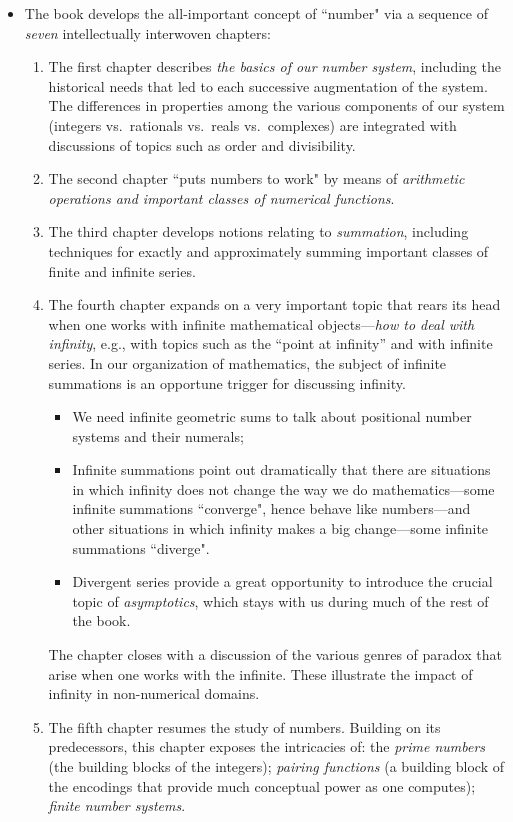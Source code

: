 \documentclass{article}[12pt]
\begin{document}
\begin{itemize}
  \item
The book develops the all-important concept of ``number" via a sequence of {\em seven} intellectually interwoven chapters:
   \begin{enumerate}
   \item       
The first chapter describes {\em the basics of our number system}, including the historical needs that led to each successive augmentation of the system.  The differences in properties among the various components of our system (integers vs.~rationals vs.~reals vs.~complexes) are integrated with discussions of topics such as order and divisibility.
  \item
The second chapter ``puts numbers to work" by means of {\em arithmetic operations and important classes of numerical functions}.
  \item
The third chapter develops notions relating to {\em summation}, including techniques for exactly and approximately summing important classes of finite and infinite series.
  \item
The fourth chapter expands on a very important topic that rears its head when one works with infinite mathematical objects---{\em how to deal with infinity}, e.g., with topics such as the ``point at infinity'' and with infinite series.  In our organization of mathematics, the subject of infinite summations is an opportune trigger for discussing infinity.
     \begin{itemize}
     \item
We need infinite geometric sums to talk about positional number systems and their numerals;
     \item
Infinite summations point out dramatically that there are situations in which infinity does not change the way we do mathematics---some infinite summations ``converge", hence behave like numbers---and other situations in which infinity makes a big change---some infinite summations ``diverge".
     \item
Divergent series provide a great opportunity to introduce the crucial topic of {\em asymptotics}, which stays with us during much of the rest of the book.
     \end{itemize}
The chapter closes with a discussion of the various genres of paradox that arise when one works with the infinite.  These illustrate the impact of infinity in non-numerical domains.
  \item
The fifth chapter resumes the study of numbers.  Building on its predecessors, this chapter exposes the intricacies of: the {\em prime numbers} (the building blocks of the integers); {\em pairing functions} (a building block of the encodings that provide much conceptual power as one computes); {\em finite number systems}.

\end{enumerate}
\end{itemize}
\end{document}
